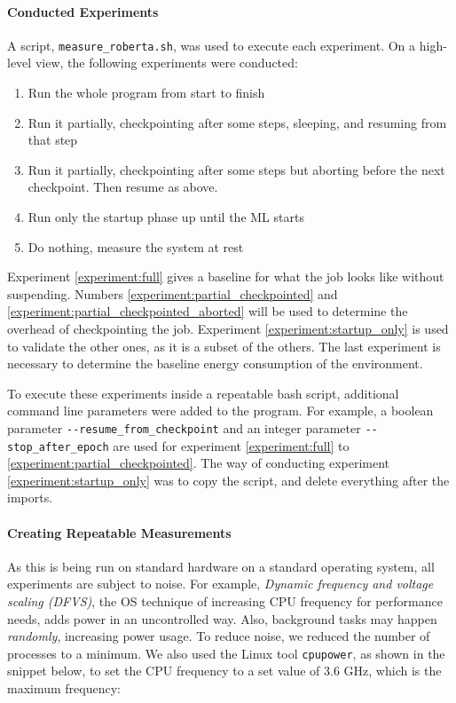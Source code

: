 \paragraph{Conducted Experiments}

A script, \verb|measure_roberta.sh|, was used to execute each experiment. 
On a high-level view, the following experiments were conducted: 

\begin{enumerate}
    \item \label{experiment:full}Run the whole program from start to finish
    \item \label{experiment:partial_checkpointed}Run it partially, checkpointing after some steps, sleeping, and resuming from that step
    \item \label{experiment:partial_checkpointed_aborted}Run it partially, checkpointing after some steps but aborting before the next checkpoint. Then resume as above.
    \item \label{experiment:startup_only}Run only the startup phase up until the ML starts
    \item \label{experiment:baseline}Do nothing, measure the system at rest
\end{enumerate}

Experiment \ref{experiment:full} gives a baseline for what the job looks like without suspending. 
Numbers \ref{experiment:partial_checkpointed} and \ref{experiment:partial_checkpointed_aborted} will be used to determine the overhead of checkpointing the job. 
Experiment \ref{experiment:startup_only} is used to validate the other ones, as it is a subset of the others. 
The last experiment is necessary to determine the baseline energy consumption of the environment.

To execute these experiments inside a repeatable bash script, additional command line parameters were added to the program. 
For example, a boolean parameter \verb|--resume_from_checkpoint| and an integer parameter \verb|--stop_after_epoch| are used for experiment \ref{experiment:full} to \ref{experiment:partial_checkpointed}. 
The way of conducting experiment \ref{experiment:startup_only} was to copy the script, and delete everything after the imports.

\paragraph{Creating Repeatable Measurements}

As this is being run on standard hardware on a standard operating system, all experiments are subject to noise. 
For example, \emph{Dynamic frequency and voltage scaling (DFVS)}, the OS technique of increasing CPU frequency for performance needs, adds power in an uncontrolled way. 
Also, background tasks may happen \emph{randomly}, increasing power usage. 
To reduce noise, we reduced the number of processes to a minimum.
We also used the Linux tool \verb|cpupower|, as shown in the snippet below, to set the CPU frequency to a set value of 3.6 GHz, which is the maximum frequency:

